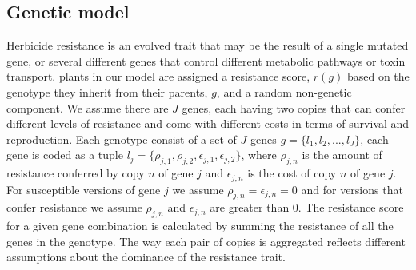 \documentclass[12pt, a4paper]{article}
\begin{document}
\subsection*{Genetic model}
Herbicide resistance is an evolved trait that may be the result of a single mutated gene, or several different genes that control different metabolic pathways or toxin transport. plants in our model are assigned a resistance score, $r(g)$ based on the genotype they inherit from their parents, $g$, and a random non-genetic component. We assume there are $J$ genes, each having two copies that can confer different levels of resistance and come with different costs in terms of survival and reproduction. Each genotype consist of a set of $J$ genes $g = \{l_1, l_2, ..., l_J\}$, each gene is coded as a tuple $l_j = \{\rho_{j,1}, \rho_{j,2}, \epsilon_{j,1}, \epsilon_{j,2}\}$, where $\rho_{j,n}$ is the amount of resistance conferred by copy $n$ of gene $j$ and $\epsilon_{j,n}$ is the cost of copy $n$ of gene $j$. For susceptible versions of gene $j$ we assume $\rho_{j,n} = \epsilon_{j,n} = 0$ and for versions that confer resistance we assume $\rho_{j,n}$ and $\epsilon_{j,n}$ are greater than 0. The resistance score for a given gene combination is calculated by summing the resistance of all the genes in the genotype. The way each pair of copies is aggregated reflects different assumptions about the dominance of the resistance trait. 
\end{document}
